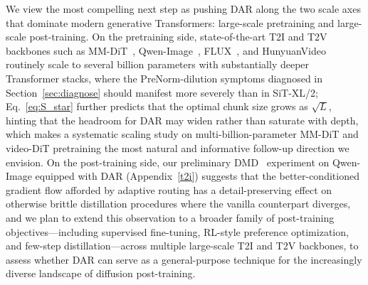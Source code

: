 \documentclass[]{ant_tech_report}
\begin{document}
We view the most compelling next step as pushing \textsc{DAR} along the two scale axes that dominate modern generative Transformers: large-scale pretraining and large-scale post-training. On the pretraining side, state-of-the-art T2I and T2V backbones such as MM-DiT~\citep{esser2024scaling}, Qwen-Image~\citep{wu2025qwen}, FLUX~\citep{flux2024}, and HunyuanVideo~\citep{kong2024hunyuanvideo} routinely scale to several billion parameters with substantially deeper Transformer stacks, where the PreNorm-dilution symptoms diagnosed in Section~\ref{sec:diagnose} should manifest more severely than in SiT-XL/2; Eq.~\eqref{eq:S_star} further predicts that the optimal chunk size grows as $\sqrt{L}$, hinting that the headroom for \textsc{DAR} may widen rather than saturate with depth, which makes a systematic scaling study on multi-billion-parameter MM-DiT and video-DiT pretraining the most natural and informative follow-up direction we envision. On the post-training side, our preliminary DMD~\citep{yin2024one,yin2024improved} experiment on Qwen-Image equipped with \textsc{DAR} (Appendix~\ref{t2i}) suggests that the better-conditioned gradient flow afforded by adaptive routing has a detail-preserving effect on otherwise brittle distillation procedures where the vanilla counterpart diverges, and we plan to extend this observation to a broader family of post-training objectives---including supervised fine-tuning, RL-style preference optimization, and few-step distillation---across multiple large-scale T2I and T2V backbones, to assess whether \textsc{DAR} can serve as a general-purpose technique for the increasingly diverse landscape of diffusion post-training.


% 
\end{document}
